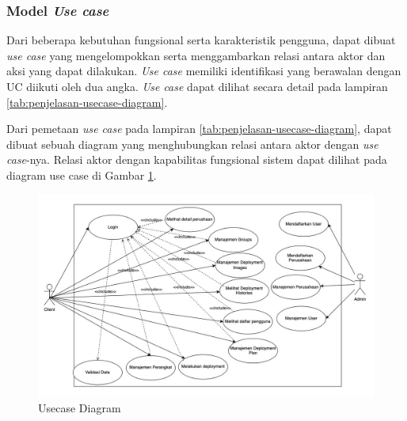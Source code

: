 \subsubsection{Model \textit{Use case}}
\label{subsec:model-usecase}
Dari beberapa kebutuhan fungsional serta karakteristik pengguna, dapat dibuat \textit{use case} yang mengelompokkan serta menggambarkan relasi antara aktor dan aksi yang dapat dilakukan. \textit{Use case} memiliki identifikasi yang berawalan dengan UC diikuti oleh dua angka. \textit{Use case} dapat dilihat secara detail pada lampiran \ref{tab:penjelasan-usecase-diagram}.

Dari pemetaan \textit{use case} pada lampiran \ref{tab:penjelasan-usecase-diagram}, dapat dibuat sebuah diagram yang menghubungkan relasi antara aktor dengan \textit{use case}-nya. Relasi  aktor dengan kapabilitas fungsional sistem dapat dilihat pada diagram use case di Gambar \ref{fig:usecase-diagram}.

\begin{figure}[ht]
  \centering
  \includegraphics[width=1\textwidth]{resources/chapter-3/usecase-diagram.jpg}
  \caption{Usecase Diagram}
  \label{fig:usecase-diagram}
\end{figure}

\pagebreak